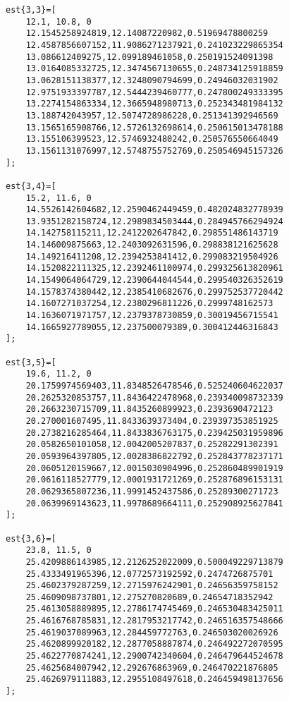 \begin{verbatim}
est{3,3}=[
    12.1, 10.8, 0
    12.1545258924819,12.14087220982,0.51969478800259
    12.4587856607152,11.9086271237921,0.241023229865354
    13.086612409275,12.099189461058,0.250191524091398
    13.0164085332725,12.3474567130655,0.248734125918859
    13.0628151138377,12.3248090794699,0.24946032031902
    12.9751933397787,12.5444239460777,0.247800249333395
    13.2274154863334,12.3665948980713,0.252343481984132
    13.188742043957,12.5074728986228,0.251341392946569
    13.1565165908766,12.5726132698614,0.250615013478188
    13.155106399523,12.5746932480242,0.250576550664049
    13.1561131076997,12.5748755752769,0.250546945157326
];

est{3,4}=[
    15.2, 11.6, 0
    14.5526142604682,12.2590462449459,0.482024832778939
    13.9351282158724,12.2989834503444,0.284945766294924
    14.142758115211,12.2412202647842,0.298551486143719
    14.146009875663,12.2403092631596,0.298838121625628
    14.149216411208,12.2394253841412,0.299083219504926
    14.1520822111325,12.2392461100974,0.299325613820961
    14.1549064064729,12.2390644044544,0.299540326352619
    14.1578374380442,12.2385410682676,0.299752537720442
    14.1607271037254,12.2380296811226,0.2999748162573
    14.1636071971757,12.2379378730859,0.30019456715541
    14.1665927789055,12.237500079389,0.300412446316843
];

est{3,5}=[
    19.6, 11.2, 0
    20.1759974569403,11.8348526478546,0.525240604622037
    20.2625320853757,11.8436422478968,0.239340098732339
    20.2663230715709,11.8435260899923,0.2393690472123
    20.270001607495,11.8433639373404,0.239397353851925
    20.2738216285464,11.8433836763175,0.239425031959896
    20.0582650101058,12.0042005207837,0.25282291302391
    20.0593964397805,12.0028386822792,0.252843778237171
    20.0605120159667,12.0015030904996,0.252860489901919
    20.0616118527779,12.0001931721269,0.252876896153131
    20.0629365807236,11.9991452437586,0.25289300271723
    20.0639969143623,11.9978689664111,0.252908925627841
];

est{3,6}=[
    23.8, 11.5, 0
    25.4209886143985,12.2126252022009,0.500049229713879
    25.4333491965396,12.0772573192592,0.2474726875701
    25.4602379287259,12.2715976242901,0.24656359758152
    25.4609098737801,12.275270820689,0.24654718352942
    25.4613058889895,12.2786174745469,0.246530483425011
    25.4616768785831,12.2817953217742,0.246516357548666
    25.4619037089963,12.284459772763,0.246503020026926
    25.4620899920182,12.2877058887874,0.246492272070595
    25.4622770874241,12.2900742340604,0.246479644524678
    25.4625684007942,12.292676863969,0.246470221876805
    25.4626979111883,12.2955108497618,0.246459498137656
];


\end{verbatim}
